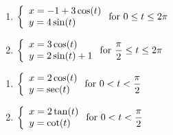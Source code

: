\begin{multicols}{2} \raggedcolumns 
\begin{enumerate}
\setcounter{enumi}{\value{HW}}

\item ${\displaystyle \left\{ \begin{array}{l} x = -1+ 3\cos(t) \\ y = 4\sin(t) \end{array} \right. \vspace{.25in} \mbox{for } 0 \leq t \leq 2\pi}$
\item ${\displaystyle \left\{ \begin{array}{l} x = 3\cos(t) \\ y = 2\sin(t)+1 \end{array} \right. \vspace{.25in} \mbox{for } \dfrac{\pi}{2} \leq t \leq 2\pi}$

\setcounter{HW}{\value{enumi}}
\end{enumerate}
\end{multicols}

\begin{multicols}{2} \raggedcolumns 
\begin{enumerate}
\setcounter{enumi}{\value{HW}}

\item ${\displaystyle \left\{ \begin{array}{l} x = 2\cos(t) \\ y = \sec(t) \end{array} \right. \vspace{.25in} \mbox{for } 0 < t < \dfrac{\pi}{2}}$
\item ${\displaystyle \left\{ \begin{array}{l} x = 2\tan(t) \\ y = \cot(t) \end{array} \right. \vspace{.25in} \mbox{for } 0 < t < \dfrac{\pi}{2}}$

\setcounter{HW}{\value{enumi}}
\end{enumerate}
\end{multicols}


